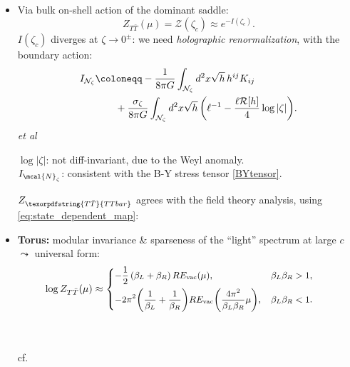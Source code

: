 \documentclass[10pt]{article}
\newcommand{\citations}[1]{{\footnotesize#1\par}}
\newcommand{\TTbar}{\texorpdfstring{\ensuremath{T\bar{T}}}{TTbar}\xspace}
\begin{document}
\begin{multicols}{3}
\begin{itemize}
\item Via bulk on-shell action of the dominant saddle:
	\begin{equation}
		Z_{T\bar T} (\mu) = \mathcal Z (\zeta_c) \approx  e^{-I(\zeta_c)}. \label{partition2}
	\end{equation}
$I(\zeta_c)$ \mbox{diverges} at $\zeta \to 0^\pm$: we need \textit{holographic renormalization}, with the boundary action:
	\begin{align}
		I_{\mathcal N_{\zeta}} & \coloneqq  - \frac{1}{8\pi G} \int_{\mathcal N_{\zeta}} d^2x \sqrt{h}\,h^{ij} K_{ij} \label{boundaryaction}
	\\& \qquad + \frac{\sigma_\zeta}{8\pi G} \int_{\mathcal N_{\zeta}} d^2x \sqrt{h} \, \bigg(\ell^{-1} - \frac{\ell  \mathcal{R}[h]}{4} \log |\zeta| \bigg). \notag
	\end{align}
	\hfill{\footnotesize \textcite{Henningson:1998gx} \textit{et al}}

	$\log |\zeta|$: not diff-invariant, due to the Weyl anomaly. \\
	$I_{\mcal{N}_\zeta}$: consistent with the B-Y stress tensor \eqref{BYtensor}.
	
	$Z_{\TTbar}$ agrees with the field theory analysis, using \eqref{eq:state_dependent_map}:

\item \textbf{Torus:} {modular invariance} \& sparseness of the ``light'' spectrum at large $c$ $\leadsto$ universal form:
	\begin{equation*}\small
	\hspace{-2em}
		\log   Z_{T\bar T}(\mu)  \approx \left\{ \begin{aligned}
		& {-\frac{1}{2}}\,(\beta_L + \beta_R)\, RE_{\text{vac}}(\mu),  &\beta_L \beta_R > 1, \\
		& {-2 \pi^2 \bigg(\frac{1}{\beta_L} + \frac{1}{\beta_R}\bigg)  RE_{\text{vac}}\bigg(\frac{4\pi^2}{\beta_L \beta_R} \mu \bigg)},  &\beta_L\beta_R < 1. %
		 \end{aligned} \right. %
	\end{equation*}
	\begin{flushright}
		\vspace{-.5\baselineskip}
		\citations{\noindent%
			\textcite{Datta:2018thy}\\
			\textcite{Apolo:2023aho}\\
			cf.~\textcite{Hartman:2014oaa}
		}
		\vspace{-.5\baselineskip}
	\end{flushright}


\end{itemize}
\end{multicols}
\end{document}
